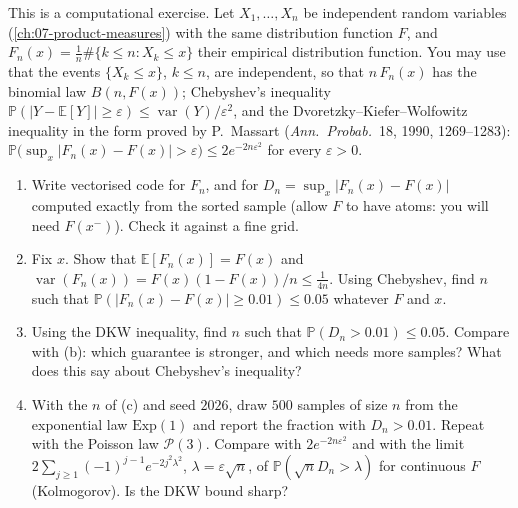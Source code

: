 \begin{exercise}\label{ex:ld-ecdf}
\hard This is a computational exercise. Let $X_1,\dots,X_n$ be independent random variables
(\cref{ch:07-product-measures}) with the same distribution function $F$, and
$F_n(x)=\frac1n\#\{k\le n:X_k\le x\}$ their empirical distribution function. You may use that the
events $\{X_k\le x\}$, $k\le n$, are independent, so that $n\,F_n(x)$ has the binomial law
$B(n,F(x))$; Chebyshev's inequality
$\mathbb P(|Y-\mathbb E[Y]|\ge\varepsilon)\le\operatorname{var}(Y)/\varepsilon^2$, and the
Dvoretzky--Kiefer--Wolfowitz inequality in the form proved by P.~Massart (\emph{Ann.\ Probab.}\ 18,
1990, 1269--1283):
$\mathbb P\big(\sup_x|F_n(x)-F(x)|>\varepsilon\big)\le2e^{-2n\varepsilon^2}$ for every $\varepsilon>0$.
\begin{enumerate}[label=(\alph*)]
  \item Write vectorised code for $F_n$, and for $D_n=\sup_x|F_n(x)-F(x)|$ computed exactly from the
    sorted sample (allow $F$ to have atoms: you will need $F(x^-)$). Check it against a fine grid.
  \item Fix $x$. Show that $\mathbb E[F_n(x)]=F(x)$ and $\operatorname{var}(F_n(x))=F(x)(1-F(x))/n\le\frac1{4n}$.
    Using Chebyshev, find $n$ such that $\mathbb P(|F_n(x)-F(x)|\ge0.01)\le0.05$ whatever $F$ and $x$.
  \item Using the DKW inequality, find $n$ such that $\mathbb P(D_n>0.01)\le0.05$. Compare with (b):
    which guarantee is stronger, and which needs more samples? What does this say about Chebyshev's
    inequality?
  \item With the $n$ of (c) and seed $2026$, draw $500$ samples of size $n$ from the exponential law
    $\mathrm{Exp}(1)$ and report the fraction with $D_n>0.01$. Repeat with the Poisson law
    $\mathcal P(3)$. Compare with $2e^{-2n\varepsilon^2}$ and with the limit
    $2\sum_{j\ge1}(-1)^{j-1}e^{-2j^2\lambda^2}$, $\lambda=\varepsilon\sqrt n$, of
    $\mathbb P(\sqrt nD_n>\lambda)$ for continuous $F$ (Kolmogorov). Is the DKW bound sharp?
\end{enumerate}
\end{exercise}

